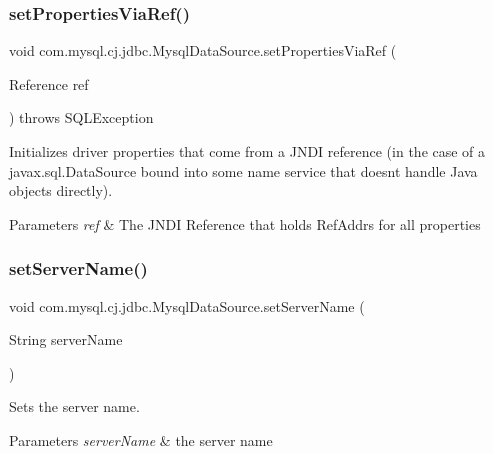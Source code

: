 \subsubsection{\texorpdfstring{set\+Properties\+Via\+Ref()}{setPropertiesViaRef()}}
{\footnotesize\ttfamily void com.\+mysql.\+cj.\+jdbc.\+Mysql\+Data\+Source.\+set\+Properties\+Via\+Ref (\begin{DoxyParamCaption}\item[{Reference}]{ref }\end{DoxyParamCaption}) throws S\+Q\+L\+Exception}

Initializes driver properties that come from a J\+N\+DI reference (in the case of a javax.\+sql.\+Data\+Source bound into some name service that doesn\textquotesingle{}t handle Java objects directly).


\begin{DoxyParams}{Parameters}
{\em ref} & The J\+N\+DI Reference that holds Ref\+Addrs for all properties \\
\hline
\end{DoxyParams}
\mbox{\label{classcom_1_1mysql_1_1cj_1_1jdbc_1_1_mysql_data_source_ab8d27cf5e8488999237c5ee21f56803e}} 
\subsubsection{\texorpdfstring{set\+Server\+Name()}{setServerName()}}
{\footnotesize\ttfamily void com.\+mysql.\+cj.\+jdbc.\+Mysql\+Data\+Source.\+set\+Server\+Name (\begin{DoxyParamCaption}\item[{String}]{server\+Name }\end{DoxyParamCaption})}

Sets the server name.


\begin{DoxyParams}{Parameters}
{\em server\+Name} & the server name \\
\hline
\end{DoxyParams}
\mbox{\label{classcom_1_1mysql_1_1cj_1_1jdbc_1_1_mysql_data_source_a334cf512df25113c3275e866ddd91cf8}} 
